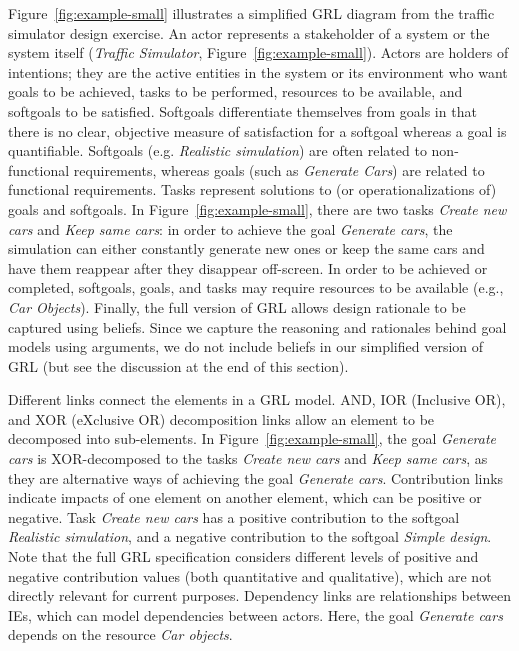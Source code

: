 Figure~\ref{fig:example-small} illustrates a simplified GRL diagram from the traffic simulator design exercise. An actor represents a stakeholder of a system or the system itself (\emph{Traffic Simulator}, Figure~\ref{fig:example-small}). Actors are holders of intentions; they are the active entities in the system or its environment who want goals to be achieved, tasks to be performed, resources to be available, and softgoals to be satisfied. Softgoals differentiate themselves from goals in that there is no clear, objective measure of satisfaction for a softgoal whereas a goal is quantifiable. Softgoals (e.g. \emph{Realistic simulation}) are often related to non-functional requirements, whereas goals (such as \emph{Generate Cars}) are related to functional requirements. Tasks represent solutions to (or operationalizations of) goals and softgoals. In Figure~\ref{fig:example-small}, there are two tasks \emph{Create new cars} and \emph{Keep same cars}: in order to achieve the goal \emph{Generate cars}, the simulation can either constantly generate new ones or keep the same cars and have them reappear after they disappear off-screen. In order to be achieved or completed, softgoals, goals, and tasks may require resources to be available (e.g., \emph{Car Objects}). Finally, the full version of GRL allows design rationale to be captured using beliefs. Since we capture the reasoning and rationales behind goal models using arguments, we do not include beliefs in our simplified version of GRL (but see the discussion at the end of this section).

Different links connect the elements in a GRL model. AND, IOR (Inclusive OR), and XOR (eXclusive OR) decomposition links allow an element to be decomposed into sub-elements. In Figure~\ref{fig:example-small}, the goal \emph{Generate cars} is XOR-decomposed to the tasks \emph{Create new cars} and \emph{Keep same cars}, as they are alternative ways of achieving the goal \emph{Generate cars}. Contribution links indicate impacts of one element on another element, which can be positive or negative. Task \emph{Create new cars} has a positive contribution to the softgoal \emph{Realistic simulation}, and a negative contribution to the softgoal \emph{Simple design}. Note that the full GRL specification considers different levels of positive and negative contribution values (both quantitative and qualitative), which are not directly relevant for current purposes. Dependency links are relationships between IEs, which can model dependencies between actors. Here, the goal \emph{Generate cars} depends on the resource \emph{Car objects}. 

